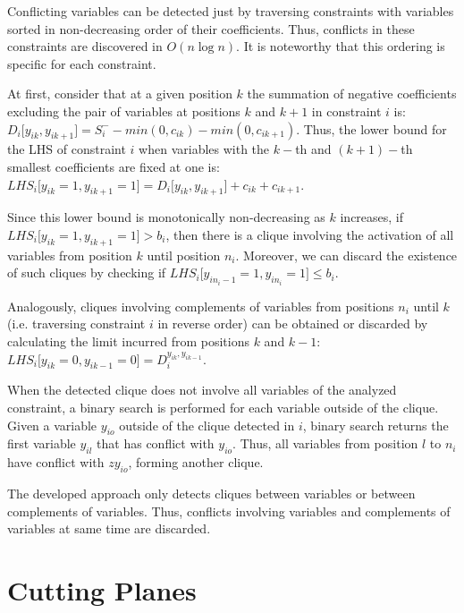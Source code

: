 \documentclass{endm}
\begin{document}
Conflicting variables can be detected just by traversing constraints with variables sorted in non-decreasing order of their coefficients. Thus, conflicts in these constraints are discovered in $O(n \log n)$. It is noteworthy that this ordering is specific for each constraint.

At first, consider that at a given position $k$ the summation of negative coefficients excluding the pair of variables at positions $k$ and $k+1$ in constraint $i$ is: $\displaystyle D_{i}\lbrack y_{ik}, y_{ik+1} \rbrack = S_i^- - min(0, c_{ik}) - min(0, c_{ik+1})$.  Thus, the lower bound for the LHS of constraint $i$ when variables with the $k-$th and $(k+1)-$th smallest coefficients are fixed at one is: $\displaystyle LHS_{i}\lbrack y_{ik} = 1, y_{ik+1} = 1 \rbrack = D_{i}\lbrack y_{ik}, y_{ik+1}\rbrack + c_{ik} + c_{ik+1}$.

Since this lower bound is monotonically non-decreasing as $k$ increases, if $\displaystyle LHS_{i}\lbrack y_{ik} = 1, y_{ik+1} = 1 \rbrack > b_{i}$, then there is a clique involving the activation of all variables from position $k$ until position $n_i$. Moreover, we can discard the existence of such cliques by checking if $\displaystyle LHS_{i}\lbrack y_{in_i-1} = 1, y_{in_i} = 1 \rbrack \leq b_i$.

Analogously, cliques involving complements of variables from positions $n_i$ until $k$ (i.e. traversing constraint $i$ in reverse order) can be obtained or discarded by calculating the limit incurred from positions $k$ and $k-1$: $\displaystyle LHS_{i}\lbrack y_{ik} = 0, y_{ik-1} = 0 \rbrack = D_{i}^{y_{ik}, y_{ik-1}} $.

When the detected clique does not involve all variables of the analyzed constraint, a binary search is performed for each variable outside of the clique. Given a variable $y_{io}$ outside of the clique detected in $i$, binary search returns the first variable $y_{il}$ that has conflict with $y_{io}$. Thus, all variables from position $l$ to $n_i$ have conflict with $zy_{io}$, forming another clique.

The developed approach only detects cliques between variables or between complements of variables. Thus, conflicts involving variables and complements of variables at same time are discarded.

\section{Cutting Planes}\label{cut}
\end{document}

